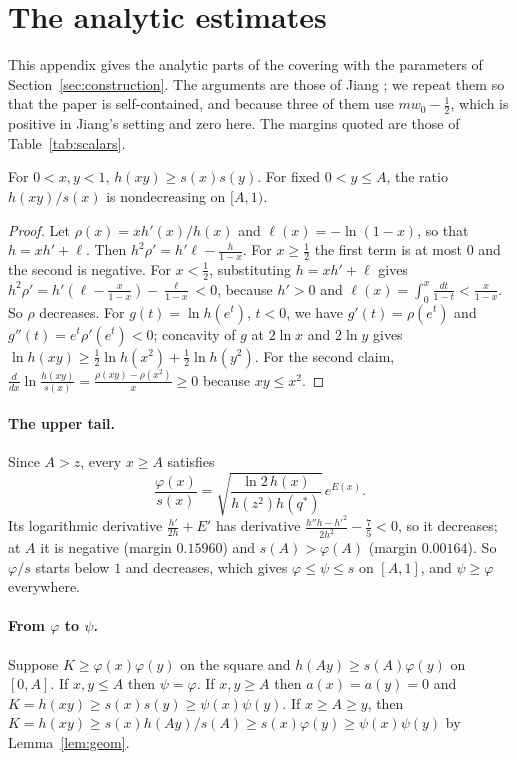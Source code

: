 \documentclass[12pt]{article}
\theoremstyle{plain}
\newcommand{\qs}{q^{*}}
\begin{document}
\section{The analytic estimates}\label{app:analytic}

This appendix gives the analytic parts of the covering with the parameters of Section~\ref{sec:construction}. The arguments are those of Jiang \cite[Sections~6--8]{Jia26}; we repeat them so that the paper is self-contained, and because three of them use $mw_0-\frac12$, which is positive in Jiang's setting and zero here. The margins quoted are those of Table~\ref{tab:scalars}.

\begin{lemma}\label{lem:geom}
For $0<x,y<1$, $h(xy)\ge s(x)s(y)$. For fixed $0<y\le A$, the ratio $h(xy)/s(x)$ is nondecreasing on $[A,1)$.
\end{lemma}

\begin{proof}
Let $\rho(x)=xh'(x)/h(x)$ and $\ell(x)=-\ln(1-x)$, so that $h=xh'+\ell$. Then $h^2\rho'=h'\ell-\frac{h}{1-x}$. For $x\ge\frac12$ the first term is at most $0$ and the second is negative. For $x<\frac12$, substituting $h=xh'+\ell$ gives $h^2\rho'=h'(\ell-\frac{x}{1-x})-\frac{\ell}{1-x}<0$, because $h'>0$ and $\ell(x)=\int_0^x\frac{dt}{1-t}<\frac{x}{1-x}$. So $\rho$ decreases. For $g(t)=\ln h(e^t)$, $t<0$, we have $g'(t)=\rho(e^t)$ and $g''(t)=e^t\rho'(e^t)<0$; concavity of $g$ at $2\ln x$ and $2\ln y$ gives $\ln h(xy)\ge\frac12\ln h(x^2)+\frac12\ln h(y^2)$. For the second claim, $\frac{d}{dx}\ln\frac{h(xy)}{s(x)}=\frac{\rho(xy)-\rho(x^2)}{x}\ge 0$ because $xy\le x^2$.
\end{proof}

\paragraph*{The upper tail.} Since $A>z$, every $x\ge A$ satisfies
\[
\frac{\varphi(x)}{s(x)}=\sqrt{\frac{\ln2\,h(x)}{h(z^2)h(\qs)}}\,e^{E(x)} .
\]
Its logarithmic derivative $\frac{h'}{2h}+E'$ has derivative $\frac{h''h-h'^2}{2h^2}-\frac75<0$, so it decreases; at $A$ it is negative (margin $0.15960$) and $s(A)>\varphi(A)$ (margin $0.00164$). So $\varphi/s$ starts below $1$ and decreases, which gives $\varphi\le\psi\le s$ on $[A,1]$, and $\psi\ge\varphi$ everywhere.

\paragraph*{From $\varphi$ to $\psi$.} Suppose $K\ge\varphi(x)\varphi(y)$ on the square and $h(Ay)\ge s(A)\varphi(y)$ on $[0,A]$. If $x,y\le A$ then $\psi=\varphi$. If $x,y\ge A$ then $a(x)=a(y)=0$ and $K=h(xy)\ge s(x)s(y)\ge\psi(x)\psi(y)$. If $x\ge A\ge y$, then $K=h(xy)\ge s(x)h(Ay)/s(A)\ge s(x)\varphi(y)\ge\psi(x)\psi(y)$ by Lemma~\ref{lem:geom}.
\end{document}

